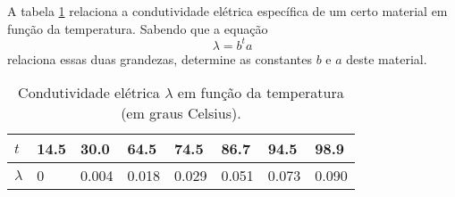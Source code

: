 \begin{ex}
A tabela \ref{condutividade} relaciona a condutividade elétrica específica de um certo material em função da temperatura. Sabendo que a equação $$\lambda=b^{t}a$$ relaciona essas duas grandezas, determine as constantes $b$ e $a$ deste material.

\begin{table}[htb]
\centering
\caption{Condutividade elétrica $\lambda$ em função da temperatura (em graus Celsius).}
\label{condutividade}
\begin{tabular}{@{}llllllll@{}}
\toprule
$t$       & 14.5 & 30.0  & 64.5  & 74.5  & 86.7  & 94.5  & 98.9  \\ \midrule
$\lambda$ & 0    & 0.004 & 0.018 & 0.029 & 0.051 & 0.073 & 0.090 \\ \bottomrule
\end{tabular}
\end{table}



\end{ex}


